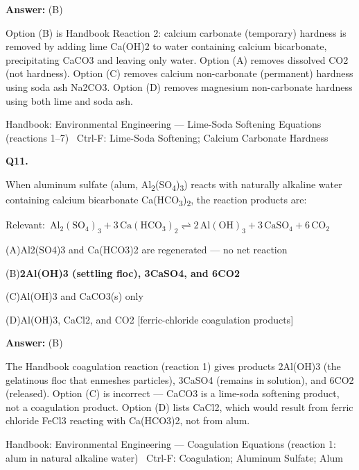 \documentclass[11pt]{article}
\newcommand{\correct}[1]{\textbf{#1}\;{\color{accent}$\checkmark$}}
\newcommand{\optline}[2]{\par\noindent\hspace{1.2em}(#1)\hspace{0.6em}#2}
\begin{document}
\vspace{2pt}\par\noindent\colorbox{boxbg}{\parbox{\dimexpr\linewidth-2\fboxsep\relax}{%
\vspace{2pt}\textbf{Answer:} (B)\par\vspace{2pt}
{\small Option (B) is Handbook Reaction 2: calcium carbonate (temporary) hardness is removed by adding lime Ca(OH)2 to water containing calcium bicarbonate, precipitating CaCO3 and leaving only water. Option (A) removes dissolved CO2 (not hardness). Option (C) removes calcium non-carbonate (permanent) hardness using soda ash Na2CO3. Option (D) removes magnesium non-carbonate hardness using both lime and soda ash.}\par\vspace{2pt}
{\footnotesize\color{soft}Handbook: Environmental Engineering --- Lime-Soda Softening Equations (reactions 1--7) \textbullet\ Ctrl-F: Lime-Soda Softening; Calcium Carbonate Hardness}\vspace{2pt}
}}
\vspace{9pt}
\filbreak
\textbf{\color{accent}Q11.}\par\vspace{2pt}
When aluminum sulfate (alum, Al\textsubscript{2}(SO\textsubscript{4})\textsubscript{3}) reacts with naturally alkaline water containing calcium bicarbonate Ca(HCO\textsubscript{3})\textsubscript{2}, the reaction products are:\par\vspace{3pt}
{\small\color{soft}Relevant:}\ $\mathrm{Al_2(SO_4)_3 + 3\,Ca(HCO_3)_2 \rightleftharpoons 2\,Al(OH)_3 + 3\,CaSO_4 + 6\,CO_2}$\par\vspace{3pt}
\optline{A}{Al2(SO4)3 and Ca(HCO3)2 are regenerated --- no net reaction}
\optline{B}{\correct{2Al(OH)3 (settling floc), 3CaSO4, and 6CO2}}
\optline{C}{Al(OH)3 and CaCO3(s) only}
\optline{D}{Al(OH)3, CaCl2, and CO2  [ferric-chloride coagulation products]}
\par\vspace{3pt}
\vspace{2pt}\par\noindent\colorbox{boxbg}{\parbox{\dimexpr\linewidth-2\fboxsep\relax}{%
\vspace{2pt}\textbf{Answer:} (B)\par\vspace{2pt}
{\small The Handbook coagulation reaction (reaction 1) gives products 2Al(OH)3 (the gelatinous floc that enmeshes particles), 3CaSO4 (remains in solution), and 6CO2 (released). Option (C) is incorrect --- CaCO3 is a lime-soda softening product, not a coagulation product. Option (D) lists CaCl2, which would result from ferric chloride FeCl3 reacting with Ca(HCO3)2, not from alum.}\par\vspace{2pt}
{\footnotesize\color{soft}Handbook: Environmental Engineering --- Coagulation Equations (reaction 1: alum in natural alkaline water) \textbullet\ Ctrl-F: Coagulation; Aluminum Sulfate; Alum}\vspace{2pt}
}}
\end{document}
